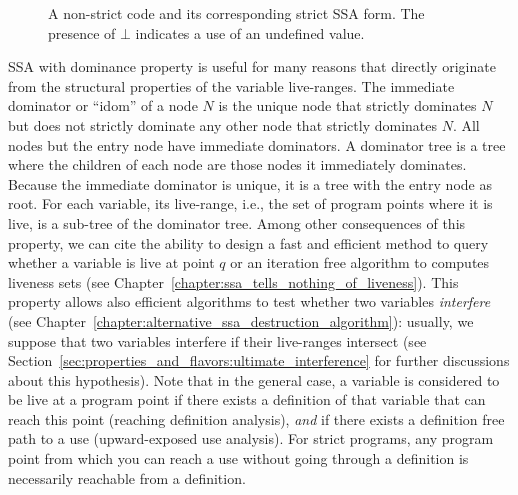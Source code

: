 \begin{figure}
\caption{A non-strict code and its corresponding strict SSA form. The presence of $\bot$ indicates a use of an undefined value.}
\end{figure}


SSA with dominance property is useful for many reasons that directly originate from the structural properties of the variable live-ranges. 
The immediate dominator or ``idom'' of a node $N$ is the unique node that strictly dominates $N$ but does not strictly dominate any other node that strictly dominates $N$. 
All nodes but the entry node have immediate dominators. 
A dominator tree is a tree where the children of each node are those nodes it immediately dominates. 
Because the immediate dominator is unique, it is a tree with the entry node as root. 
For each variable, its live-range, i.e., the set of program points where it is live, is a sub-tree of the dominator tree. 
Among other consequences of this property, we can cite the ability to design a fast and efficient method to query whether a variable is live at point $q$ or an iteration free algorithm to computes liveness sets (see Chapter~\ref{chapter:ssa_tells_nothing_of_liveness}). 
This property allows also efficient algorithms to test whether two variables \emph{interfere} (see Chapter~\ref{chapter:alternative_ssa_destruction_algorithm}): 
usually, we suppose that two variables interfere if their live-ranges intersect (see Section~\ref{sec:properties_and_flavors:ultimate_interference} for further discussions about this hypothesis). 
Note that in the general case, a variable is considered to be live at a program point if there exists a definition of that variable that can reach this point (reaching definition analysis), \emph{and} if there exists a definition free path to a use (upward-exposed use analysis). 
For strict programs, any program point from which you can reach a use without going through a definition is necessarily reachable from a definition.

